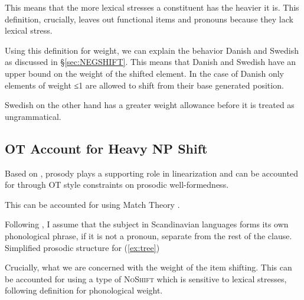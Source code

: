 \documentclass[12pt, letterpaper]{article}
\begin{document}
\ex This means that the more lexical stresses a constituent has the heavier it is. This definition, crucially, leaves out functional items and pronouns because they lack lexical stress. 

\ex Using this definition for weight, we can explain the behavior Danish and Swedish as discussed in §\ref{sec:NEGSHIFT}. This means that Danish and Swedish have an upper bound on the weight of the shifted element. In the case of Danish only elements of weight ≤1 are allowed to shift from their base generated position. 

\ex Swedish on the other hand has a greater weight allowance before it is treated as ungrammatical. 
\z 

\subsection{OT Account for Heavy NP Shift} \label{sec:HNPS}

\ea Based on \citet{anttilaRoleProsodyEnglish2010}, prosody plays a supporting role in linearization and can be accounted for through OT style constraints on prosodic well-formedness. 

\ex This can be accounted for using Match Theory \citep{selkirkClauseIntonationalPhrase2009,selkirkSyntaxPhonologyInterface2011}.

\ex Following \citet{myrbergSisterhoodProsodicBranching2013,myrbergProsodicWordSwedish2013,myrbergProsodicHierarchySwedish2015}, I assume that the subject in Scandinavian languages forms its own phonological phrase, if it is not a pronoun, separate from the rest of the clause. 
	\ea Simplified prosodic structure for (\ref{ex:tree})\\

	\z

\ex Crucially, what we are concerned with the weight of the item shifting. This can be accounted for using a type of \textsc{NoShift} \citep{bennettLightestRightApparently2016} which is sensitive to lexical stresses, following  definition for phonological weight.
\end{document}
